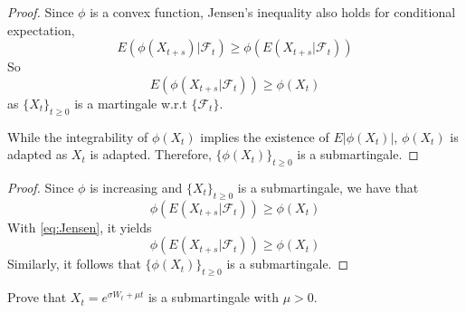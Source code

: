    \begin{subproblem}
        \item
        \begin{proof}
            Since $\phi$ is a convex function, Jensen's inequality
            also holds for conditional expectation,
            \begin{equation}
                \label{eq:Jensen}
                E(\phi(X_{t+s})|\mathcal F_t)
                \geq\phi(E(X_{t+s}|\mathcal F_t))
            \end{equation}
            So
            \[E(\phi(X_{t+s}|\mathcal F_t))\geq\phi(X_t)\]
            as $\{X_t\}_{t\geq 0}$ is a martingale w.r.t $\{\mathcal F_t\}$.

            While the integrability of $\phi(X_t)$ implies the existence of
            $E|\phi(X_t)|$, $\phi(X_t)$ is adapted as $X_t$ is adapted.
            Therefore, $\{\phi(X_t)\}_{t\geq 0}$ is a submartingale.
        \end{proof}

        \item
        \begin{proof}
            Since $\phi$ is increasing and $\{X_t\}_{t\geq 0}$ is a
            submartingale, we have that
            \[\phi(E(X_{t+s}|\mathcal F_t))\geq\phi(X_t)\]
            With \cref{eq:Jensen}, it yields
            \[\phi(E(X_{t+s}|\mathcal F_t))\geq\phi(X_t)\]
            Similarly, it follows that $\{\phi(X_t)\}_{t\geq 0}$
            is a submartingale.
        \end{proof}
    \end{subproblem}

    \problem
    \begin{question}
        Prove that $X_t=e^{\sigma W_t+\mu t}$ is a submartingale with $\mu>0$.
    \end{question}

